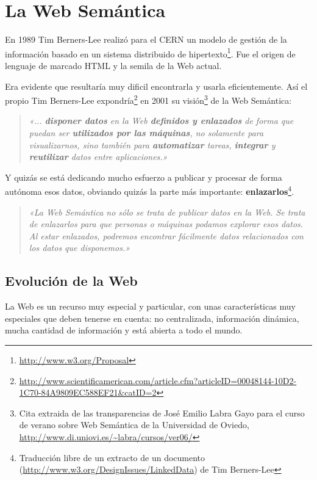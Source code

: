 
\section{La Web Semántica}

En 1989 Tim Berners-Lee realizó para el CERN un modelo de gestión de la 
información basado en un sistema distribuido de hipertexto\footnote{\url{http://www.w3.org/Proposal}}. 
Fue el origen de lenguaje de marcado HTML y la semila de la Web actual.

Era evidente que resultaría muy dificil encontrarla y usarla eficientemente. 
Así el propio Tim Berners-Lee 
expondría\footnote{\url{http://www.scientificamerican.com/article.cfm?articleID=00048144-10D2-1C70-84A9809EC588EF21&catID=2}}
en 2001 su visión\footnote{Cita extraida de las transparencias de José Emilio 
Labra Gayo para el curso de verano sobre Web Semántica de la Universidad de 
Oviedo, \url{http://www.di.uniovi.es/~labra/cursos/ver06/}} de la Web Semántica:

\begin{quote}
	\emph{«... \textbf{disponer datos} en la Web \textbf{definidos y enlazados} 
	de forma que puedan ser \textbf{utilizados por las máquinas}, no solamente 
	para visualizarnos, sino también para \textbf{automatizar} tareas, 
	\textbf{integrar} y \textbf{reutilizar} datos entre aplicaciones.»}
\end{quote} 

Y quizás se está dedicando mucho esfuerzo a publicar y procesar de forma autónoma
esos datos, obviando quizás la parte más importante: 
\textbf{enlazarlos}\footnote{Traducción libre de un extracto de un documento (\url{http://www.w3.org/DesignIssues/LinkedData}) de Tim Berners-Lee}.

\begin{quote}
	\emph{«La Web Semántica no sólo se trata de publicar datos en la Web. Se 
	trata de enlazarlos para que personas o máquinas podamos explorar esos 
	datos. Al estar enlazados, podremos encontrar fácilmente datos relacionados 
	con los datos que disponemos.»}
\end{quote}

\subsection{Evolución de la Web}

La Web es un recurso muy especial y particular, con unas características muy 
especiales que deben tenerse en cuenta: no centralizada, información dinámica,
mucha cantidad de información y está abierta a todo el mundo.

